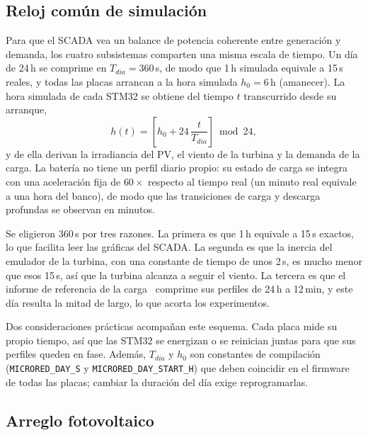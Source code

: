 \documentclass[conference]{IEEEtran}
\begin{document}
\subsection{Reloj común de simulación}
\label{sec:reloj}

Para que el SCADA vea un balance de potencia coherente entre generación y demanda, los cuatro subsistemas comparten una misma escala de tiempo. Un día de 24\,h se comprime en $T_{dia}=360$\,s, de modo que 1\,h simulada equivale a 15\,s reales, y todas las placas arrancan a la hora simulada $h_0=6$\,h (amanecer). La hora simulada de cada STM32 se obtiene del tiempo $t$ transcurrido desde su arranque,
\begin{equation*}
h(t) = \left[h_0 + 24\,\frac{t}{T_{dia}}\right] \bmod 24,
\end{equation*}
y de ella derivan la irradiancia del PV, el viento de la turbina y la demanda de la carga. La batería no tiene un perfil diario propio: su estado de carga se integra con una aceleración fija de $60\times$ respecto al tiempo real (un minuto real equivale a una hora del banco), de modo que las transiciones de carga y descarga profundas se observan en minutos.

Se eligieron 360\,s por tres razones. La primera es que 1\,h equivale a 15\,s exactos, lo que facilita leer las gráficas del SCADA. La segunda es que la inercia del emulador de la turbina, con una constante de tiempo de unos 2\,s, es mucho menor que esos 15\,s, así que la turbina alcanza a seguir el viento. La tercera es que el informe de referencia de la carga~\cite{hernandez2026carga} comprime sus perfiles de 24\,h a 12\,min, y este día resulta la mitad de largo, lo que acorta los experimentos.

Dos consideraciones prácticas acompañan este esquema. Cada placa mide su propio tiempo, así que las STM32 se energizan o se reinician juntas para que sus perfiles queden en fase. Además, $T_{dia}$ y $h_0$ son constantes de compilación (\texttt{MICRORED\_DAY\_S} y \texttt{MICRORED\_DAY\_START\_H}) que deben coincidir en el firmware de todas las placas; cambiar la duración del día exige reprogramarlas.

\subsection{Arreglo fotovoltaico}
\label{sec:modelo_pv}
\end{document}
